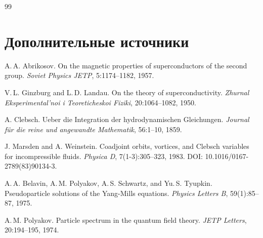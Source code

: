 \documentclass[11pt,a4paper]{article}
\begin{document}
\begin{thebibliography}{99}
		\section*{Дополнительные источники}
		
		A.\,A. Abrikosov.
		\newblock On the magnetic properties of superconductors of the second group.
		\newblock \textit{Soviet Physics JETP}, 5:1174--1182, 1957.
		
		V.\,L. Ginzburg and L.\,D. Landau.
		\newblock On the theory of superconductivity.
		\newblock \textit{Zhurnal Eksperimental'noi i Teoreticheskoi Fiziki}, 20:1064--1082, 1950.
		
		A. Clebsch.
		\newblock Ueber die Integration der hydrodynamischen Gleichungen.
		\newblock \textit{Journal für die reine und angewandte Mathematik}, 56:1--10, 1859.
		
		J. Marsden and A. Weinstein.
		\newblock Coadjoint orbits, vortices, and Clebsch variables for incompressible fluids.
		\newblock \textit{Physica D}, 7(1-3):305--323, 1983.
		\newblock DOI: 10.1016/0167-2789(83)90134-3.
		
		A.\,A. Belavin, A.\,M. Polyakov, A.\,S. Schwartz, and Yu.\,S. Tyupkin.
		\newblock Pseudoparticle solutions of the Yang-Mills equations.
		\newblock \textit{Physics Letters B}, 59(1):85--87, 1975.
		
		A.\,M. Polyakov.
		\newblock Particle spectrum in the quantum field theory.
		\newblock \textit{JETP Letters}, 20:194--195, 1974.
		
	\end{thebibliography}
	
	
\end{document}
